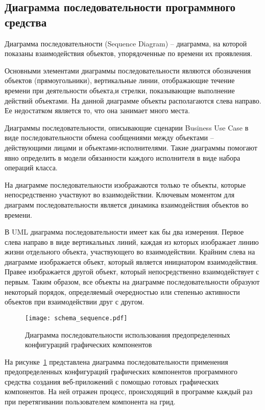 \subsection{Диаграмма последовательности программного средства}
\label{sec:modeling:sequence}

Диаграмма последовательности (Sequence Diagram) -- диаграмма, на которой показаны взаимодействия объектов, упорядоченные по времени их проявления.

Основными элементами диаграммы последовательности являются обозначения объектов (прямоугольники), вертикальные линии, отображающие течение времени при деятельности объекта,и стрелки, показывающие выполнение действий объектами. На данной диаграмме объекты располагаются слева направо. Ее недостатком является то, что она занимает много места.

Диаграммы последовательности, описывающие сценарии Business Use Case в виде последовательности обмена сообщениями между объектами -- действующими лицами и объектами-исполнителями. Такие диаграммы помогают явно определить в модели обязанности каждого исполнителя в виде набора операций класса.

На диаграмме последовательности изображаются только те объекты, которые непосредственно участвуют во взаимодействии. Ключевым моментом для диаграмм последовательности является динамика взаимодействия объектов во времени.

В UML диаграмма последовательности имеет как бы два измерения. Первое слева направо в виде вертикальных линий, каждая из которых изображает линию жизни отдельного объекта, участвующего во взаимодействии. Крайним слева на диаграмме изображается объект, который является инициатором взаимодействия. Правее изображается другой объект, который непосредственно взаимодействует с первым. Таким образом, все объекты на диаграмме последовательности образуют некоторый порядок, определяемый очередностью или степенью активности объектов при взаимодействии друг с другом.

\begin{figure}[ht]
\centering
    \texttt{[image: schema\_sequence.pdf]}
    \caption{Диаграмма последовательности использования предопределенных конфигураций графических компонентов}
    \label{sec:design:sequence_diagram}
\end{figure}

На рисунке~\ref{sec:design:sequence_diagram} представлена диаграмма последовательности применения предопределенных конфигураций графических компонентов программного средства создания веб-приложений с помощью готовых графических компонентов. 
На ней отражен процесс, происходящий в программе каждый раз при перетягивании пользователем компонента на грид.\pagebreak

